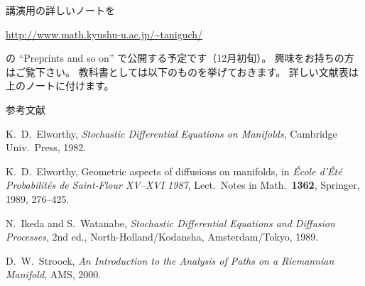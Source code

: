 \documentclass[uplatex,dvipdfmx]{jlreq}
\begin{document}
講演用の詳しいノートを
\begin{center}
\url{http://www.math.kyushu-u.ac.jp/~taniguch/}
\end{center}
の ``Preprints and so on'' で公開する予定です（12月初旬）。
興味をお持ちの方はご覧下さい。
教科書としては以下のものを挙げておきます。
詳しい文献表は上のノートに付けます。

\begin{center}\textsc{参考文献}\end{center}

\begin{enumerate}[{[1]}]
  \setlength{\itemsep}{2pt}
  \item[{[1]}] K.~D.~Elworthy,
        \textit{Stochastic Differential Equations on Manifolds},
        Cambridge Univ.\ Press, 1982.
  \item[{[2]}] K.~D.~Elworthy,
        Geometric aspects of diffusions on manifolds,
        in \textit{École d'Été Probabilités de Saint-Flour XV--XVI 1987},
        Lect.\ Notes in Math.\ \textbf{1362}, Springer, 1989, 276--425.
  \item[{[3]}] N.~Ikeda and S.~Watanabe,
        \textit{Stochastic Differential Equations and Diffusion Processes},
        2nd ed., North-Holland/Kodansha, Amsterdam/Tokyo, 1989.
  \item[{[4]}] D.~W.~Stroock,
        \textit{An Introduction to the Analysis of Paths on a Riemannian Manifold},
        AMS, 2000.
\end{enumerate}
\end{document}
